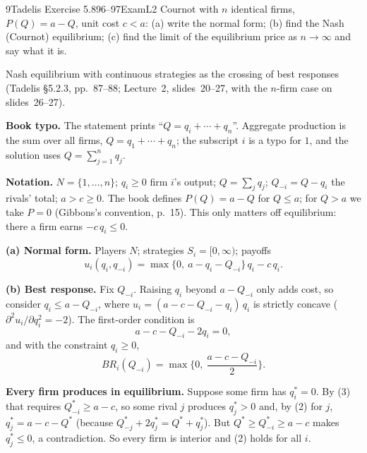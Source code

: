 \begin{exsol}{9}{Tadelis Exercise 5.8}{96--97}{Exam}{L2}
\asked Cournot with $n$ identical firms, $P(Q) = a - Q$, unit cost $c < a$: (a) write the normal
form; (b) find the Nash (Cournot) equilibrium; (c) find the limit of the equilibrium price as
$n \to \infty$ and say what it is.

\method Nash equilibrium with continuous strategies as the crossing of best responses (Tadelis
\S5.2.3, pp.~87--88; Lecture~2, slides~20--27, with the $n$-firm case on slides~26--27).

\solution
\textbf{Book typo.} The statement prints ``$Q = q_i + \cdots + q_n$''. Aggregate production is the
sum over all firms, $Q = q_1 + \cdots + q_n$; the subscript $i$ is a typo for $1$, and the solution
uses $Q = \sum_{j=1}^n q_j$.

\textbf{Notation.} $N = \{1, \dots, n\}$; $q_i \ge 0$ firm $i$'s output; $Q = \sum_j q_j$;
$Q_{-i} = Q - q_i$ the rivals' total; $a > c \ge 0$. The book defines $P(Q) = a - Q$ for $Q \le a$;
for $Q > a$ we take $P = 0$ (Gibbons's convention, p.~15). This only matters off equilibrium:
there a firm earns $-c\,q_i \le 0$.

\textbf{(a) Normal form.} Players $N$; strategies $S_i = [0, \infty)$; payoffs
\[
  u_i(q_i, q_{-i}) = \max\{0,\ a - q_i - Q_{-i}\}\, q_i - c\, q_i . \tag{1}
\]

\textbf{(b) Best response.} Fix $Q_{-i}$. Raising $q_i$ beyond $a - Q_{-i}$ only adds cost, so
consider $q_i \le a - Q_{-i}$, where $u_i = (a - c - Q_{-i} - q_i)\,q_i$ is strictly concave
($\partial^2 u_i/\partial q_i^2 = -2$). The first-order condition is
\[
  a - c - Q_{-i} - 2q_i = 0, \tag{2}
\]
and with the constraint $q_i \ge 0$,
\[
  BR_i(Q_{-i}) = \max\Big\{0,\ \frac{a - c - Q_{-i}}{2}\Big\}. \tag{3}
\]

\textbf{Every firm produces in equilibrium.} Suppose some firm has $q_i^* = 0$. By (3) that
requires $Q_{-i}^* \ge a - c$, so some rival $j$ produces $q_j^* > 0$ and, by (2) for $j$,
$q_j^* = a - c - Q^*$ (because $Q_{-j}^* + 2q_j^* = Q^* + q_j^*$). But $Q^* \ge Q_{-i}^* \ge a - c$
makes $q_j^* \le 0$, a contradiction. So every firm is interior and (2) holds for all $i$.


\end{exsol}
